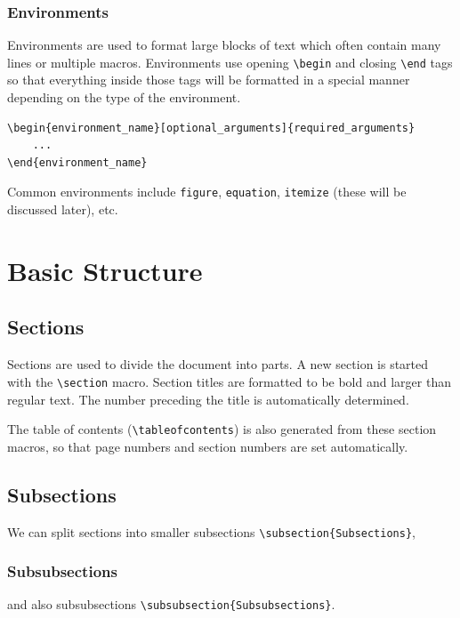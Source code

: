 \documentclass[11pt, twoside]{article}
\begin{document}
\subsubsection{Environments}
Environments are used to format large blocks of text which often contain many lines or multiple macros. Environments use opening \lstinline|\begin| and closing \lstinline|\end| tags so that everything inside those tags will be formatted in a special manner depending on the type of the environment.
\begin{lstlisting}
\begin{environment_name}[optional_arguments]{required_arguments}
    ...
\end{environment_name} 
\end{lstlisting}
Common environments include \lstinline{figure}, \lstinline{equation}, \lstinline{itemize} (these will be discussed later), etc.
\newpage
\section{Basic Structure}
\subsection{Sections}
Sections are used to divide the document into parts. A new section is started with the \lstinline{\section} macro. Section titles are formatted to be bold and larger than regular text. The number preceding the title is automatically determined.

The table of contents (\lstinline{\tableofcontents}) is also generated from these section macros, so that page numbers and section numbers are set automatically.
\subsection{Subsections}
We can split sections into smaller subsections \lstinline|\subsection{Subsections}|,
\subsubsection{Subsubsections}
and also subsubsections \lstinline|\subsubsection{Subsubsections}|.
\end{document}

